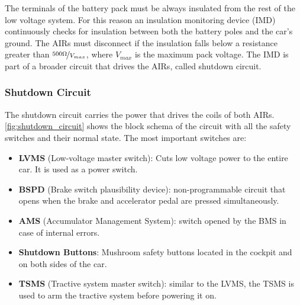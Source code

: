 The terminals of the battery pack must be always insulated from the rest of the low voltage system. For this reason an insulation monitoring device (IMD) continuously checks for insulation between both the battery poles and the car's ground. The AIRs must disconnect if the insulation falls below a resistance greater than $\nicefrac{500\Omega}{V_{max}}$, where $V_{max}$ is the maximum pack voltage. The IMD is part of a broader circuit that drives the AIRs, called shutdown circuit.

\subsubsection{Shutdown Circuit}
The shutdown circuit carries the power that drives the coils of both AIRs. \autoref{fig:shutdown_circuit} shows the block schema of the circuit with all the safety switches and their normal state.
The most important switches are:
\begin{itemize}
    \item \textbf{LVMS} (Low-voltage master switch): Cuts low voltage power to the entire car. It is used as a power switch.
    \item \textbf{BSPD} (Brake switch plausibility device): non-programmable circuit that opens when the brake and accelerator pedal are pressed simultaneously.
    \item \textbf{AMS} (Accumulator Management System): switch opened by the BMS in case of internal errors.
    \item \textbf{Shutdown Buttons}: Mushroom safety buttons located in the cockpit and on both sides of the car.
    \item \textbf{TSMS} (Tractive system master switch): similar to the LVMS, the TSMS is used to arm the tractive system before powering it on.
\end{itemize}

